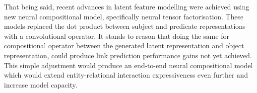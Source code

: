That being said, recent advances in latent feature modelling were achieved using new neural compositional model, specifically neural tensor factorisation. These models replaced the dot product between subject and predicate representations with a convolutional operator. It stands to reason that doing the same for compositional operator between the generated latent representation and object representation, could produce link prediction performance gains not yet achieved. This simple adjustment would produce an end-to-end neural compositional model which would extend entity-relational interaction expressiveness even further and increase model capacity.
